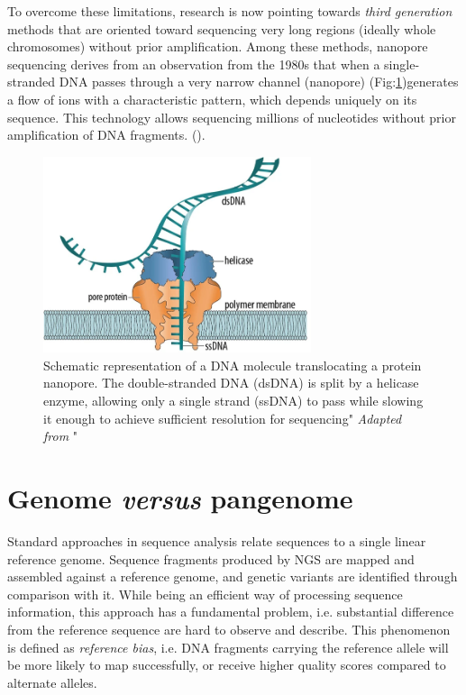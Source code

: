 To overcome these limitations, research is now pointing towards \textit{third generation} methods that are oriented toward sequencing very long regions (ideally whole chromosomes) without  prior amplification. Among these methods, nanopore sequencing derives from an observation from the 1980s that when a single-stranded DNA passes through a very narrow channel (nanopore) (Fig:\ref{fig:nanopore.png})generates a flow of ions with a characteristic pattern, which depends uniquely on its sequence. This technology allows sequencing millions of nucleotides without prior amplification of DNA fragments. (\cite{wiki:nanopore}).

\begin{figure}[H]
\centering
\includegraphics[width=0.70\textwidth]{fig/nanopore.png}
\decoRule
\caption{Schematic representation of a DNA molecule translocating a protein nanopore. The double-stranded DNA (dsDNA) is split by a helicase enzyme, allowing only a single strand (ssDNA) to pass while slowing it enough to achieve sufficient resolution for sequencing" \textit{Adapted from} \cite{sutton2019radiation}"} 
\label{fig:nanopore.png}
\end{figure}







\section{Genome \textit{versus} pangenome}

Standard approaches in sequence analysis relate sequences to a single linear reference genome. Sequence fragments produced by NGS are mapped and assembled against a reference genome, and genetic variants are identified through comparison with it. While being an efficient way of processing sequence information, this approach has a fundamental problem, i.e. substantial difference from the reference sequence are hard to observe and describe. This phenomenon is defined as \textit{reference bias}, i.e.  DNA fragments carrying the reference allele will be more likely to map successfully, or receive higher quality scores compared to alternate alleles. \cite{eizenga2020pangenome} 


